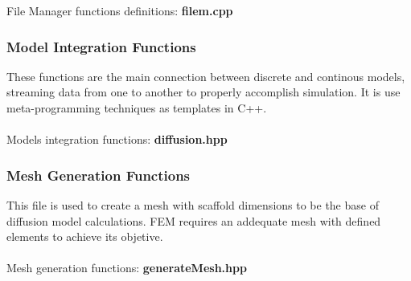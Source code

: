 File Manager functions definitions: \textbf{filem.cpp}
 


\newpage
\subsubsection{Model Integration Functions}
These functions are the main connection between discrete and continous models, streaming data from one to another to properly accomplish simulation. It is use meta-programming techniques as templates in C++.\\
\\
Models integration functions: \textbf{diffusion.hpp}
 


\newpage
\subsubsection{Mesh Generation Functions}
This file is used to create a mesh with scaffold dimensions to be the base of diffusion model calculations. FEM requires an addequate mesh with defined elements to achieve its objetive.\\
\\
Mesh generation functions: \textbf{generateMesh.hpp}
 						